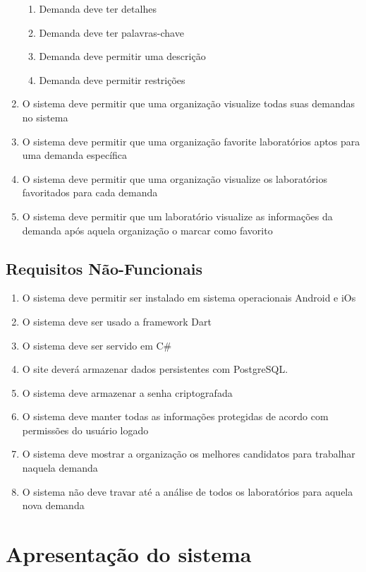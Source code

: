 \begin{enumerate}
\begin{enumerate}
		\item Demanda deve ter detalhes
		\item Demanda deve ter palavras-chave
		\item Demanda deve permitir uma descrição
		\item Demanda deve permitir restrições
	\end{enumerate}
	\item O sistema deve permitir que uma organização visualize todas suas demandas no sistema
	\item O sistema deve permitir que uma organização favorite laboratórios aptos para uma demanda específica
	\item O sistema deve permitir que uma organização visualize os laboratórios favoritados para cada demanda
	\item O sistema deve permitir que um laboratório visualize as informações da demanda após aquela organização o marcar como favorito
\end{enumerate}

\subsection{Requisitos Não-Funcionais}\label{subsec:rnf}
\begin{enumerate}
\item O sistema deve permitir ser instalado em sistema operacionais Android e iOs
\item O sistema deve ser usado a framework Dart
\item O sistema deve ser servido em C\#
\item O site deverá armazenar dados persistentes com PostgreSQL.
\item O sistema deve armazenar a senha criptografada
\item O sistema deve manter todas as informações protegidas de acordo com permissões do usuário logado
\item O sistema deve mostrar a organização os melhores candidatos para trabalhar naquela demanda
\item O sistema não deve travar até a análise de todos os laboratórios para aquela nova demanda
\end{enumerate}


\section{Apresentação do sistema}\label{sec:apresentacaoSistema}

